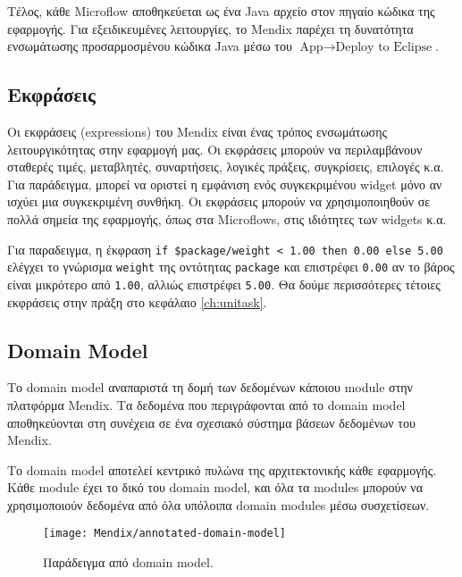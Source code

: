             Τέλος, κάθε Microflow αποθηκεύεται ως ένα Java αρχείο στον πηγαίο κώδικα της εφαρμογής. Για εξειδικευμένες λειτουργίες, το Mendix παρέχει τη δυνατότητα ενσωμάτωσης προσαρμοσμένου κώδικα Java μέσω του $ \text{App} \rightarrow \text{Deploy to Eclipse} $.

        \subsection{Εκφράσεις} \label{sec:MendixExpressions}
            Οι εκφράσεις (expressions) του Mendix είναι ένας τρόπος ενσωμάτωσης λειτουργικότητας στην εφαρμογή μας. Οι εκφράσεις μπορούν να περιλαμβάνουν σταθερές τιμές, μεταβλητές, συναρτήσεις, λογικές πράξεις, συγκρίσεις, επιλογές κ.α. Για παράδειγμα, μπορεί να οριστεί η εμφάνιση ενός συγκεκριμένου widget μόνο αν ισχύει μια συγκεκριμένη συνθήκη. Οι εκφράσεις μπορούν να χρησιμοποιηθούν σε πολλά σημεία της εφαρμογής, όπως στα Microflows, στις ιδιότητες των widgets κ.α.

            Για παραδειγμα, η έκφραση \verb|if $package/weight < 1.00 then 0.00 else 5.00| ελέγχει το γνώρισμα \texttt{weight} της οντότητας \texttt{package} και επιστρέφει \texttt{0.00} αν το βάρος είναι μικρότερο από \texttt{1.00}, αλλιώς επιστρέφει \texttt{5.00}. Θα δούμε περισσότερες τέτοιες εκφράσεις στην πράξη στο κεφάλαιο \ref{ch:unitask}.

        \subsection{Domain Model} \label{sec:MendixDomainModel}
            Το domain model αναπαριστά τη δομή των δεδομένων κάποιου module στην πλατφόρμα Mendix. Τα δεδομένα που περιγράφονται από το domain model αποθηκεύονται στη συνέχεια σε ένα σχεσιακό σύστημα βάσεων δεδομένων του Mendix.

            Το domain model αποτελεί κεντρικό πυλώνα της αρχιτεκτονικής κάθε εφαρμογής. Κάθε module έχει το δικό του domain model, και όλα τα modules μπορούν να χρησιμοποιούν δεδομένα από όλα υπόλοιπα domain modules μέσω συσχετίσεων.

            \begin{figure}[h!] \noindent \centering
                    \texttt{[image: Mendix/annotated-domain-model]}
                    \caption{\centering Παράδειγμα από domain model. \cite{mendixDoc}}
                    \label{fig:MendixDomainModel}
            \end{figure}

